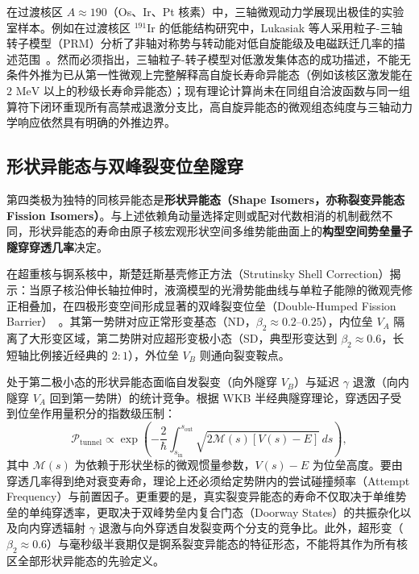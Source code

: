 在过渡核区 $A\approx 190$（Os、Ir、Pt 核素）中，三轴微观动力学展现出极佳的实验室样本。例如在过渡核区 $^{191}\mathrm{Ir}$ 的低能结构研究中，Lukasiak 等人采用粒子-三轴转子模型（PRM）分析了非轴对称势与转动能对低自旋能级及电磁跃迁几率的描述范围~\cite{continuation-g18-lukasiak-1979-191ir-triaxial-rotor}。然而必须指出，三轴粒子-转子模型对低激发集体态的成功描述，不能无条件外推为已从第一性微观上完整解释高自旋长寿命异能态（例如该核区激发能在 $2\text{ MeV}$ 以上的秒级长寿命异能态）；现有理论计算尚未在同组自洽波函数与同一组算符下闭环重现所有高禁戒退激分支比，高自旋异能态的微观组态纯度与三轴动力学响应依然具有明确的外推边界。

\subsection{形状异能态与双峰裂变位垒隧穿}\label{sec:4-6-4}

第四类极为独特的同核异能态是\textbf{形状异能态（Shape Isomers，亦称裂变异能态 Fission Isomers）}。与上述依赖角动量选择定则或配对代数相消的机制截然不同，形状异能态的寿命由原子核宏观形状空间多维势能曲面上的\textbf{构型空间势垒量子隧穿穿透几率}决定。

在超重核与锕系核中，斯楚廷斯基壳修正方法（Strutinsky Shell Correction）揭示：当原子核沿伸长轴拉伸时，液滴模型的光滑势能曲线与单粒子能隙的微观壳修正相叠加，在四极形变空间形成显著的双峰裂变位垒（Double-Humped Fission Barrier）~\cite{book-jain-nuclear-isomers}。其第一势阱对应正常形变基态（ND，$\beta_2 \approx 0.2\text{--}0.25$），内位垒 $V_A$ 隔离了大形变区域，第二势阱对应超形变极小态（SD，典型形变达到 $\beta_2 \approx 0.6$，长短轴比例接近经典的 $2:1$），外位垒 $V_B$ 则通向裂变鞍点。

处于第二极小态的形状异能态面临自发裂变（向外隧穿 $V_B$）与延迟 $\gamma$ 退激（向内隧穿 $V_A$ 回到第一势阱）的统计竞争。根据 WKB 半经典隧穿理论，穿透因子受到位垒作用量积分的指数级压制：
\begin{equation}\label{eq:4-6-WKB-tunneling}
\mathcal{P}_{\mathrm{tunnel}} \propto \exp\left( -\frac{2}{\hbar} \int_{s_{\mathrm{in}}}^{s_{\mathrm{out}}} \sqrt{2 \mathcal{M}(s) \left[ V(s) - E \right]} \, ds \right),
\end{equation}
其中 $\mathcal{M}(s)$ 为依赖于形状坐标的微观惯量参数，$V(s) - E$ 为位垒高度。要由穿透几率得到绝对衰变寿命，理论上还必须给定势阱内的尝试碰撞频率（Attempt Frequency）与前置因子。更重要的是，真实裂变异能态的寿命不仅取决于单维势垒的单纯穿透率，更取决于双峰势垒内复合门态（Doorway States）的共振杂化以及向内穿透辐射 $\gamma$ 退激与向外穿透自发裂变两个分支的竞争比。此外，超形变（$\beta_2 \approx 0.6$）与毫秒级半衰期仅是锕系裂变异能态的特征形态，不能将其作为所有核区全部形状异能态的先验定义。

